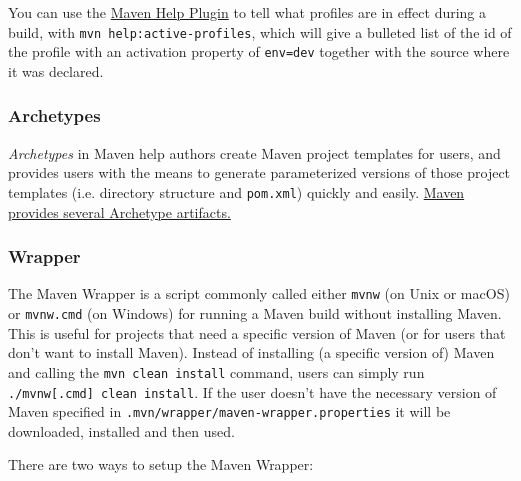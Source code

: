 \documentclass[table, xcdraw]{article}%
\begin{document}
You can use the \href{https://maven.apache.org/plugins/maven-help-plugin/}{Maven Help Plugin} to tell what profiles are in effect during a build, with \texttt{mvn help:active-profiles}, which will give a bulleted list of the id of the profile with an activation property of \texttt{env=dev} together with the source where it was declared.

\subsubsection{Archetypes}

\emph{Archetypes} in Maven help authors create Maven project templates for users, and provides users with the means to generate parameterized versions of those project templates (i.e. directory structure and \texttt{pom.xml}) quickly and easily. \href{https://maven.apache.org/guides/introduction/introduction-to-archetypes.html}{Maven provides several Archetype artifacts.}

\subsubsection{Wrapper}

The Maven Wrapper is a script commonly called either \texttt{mvnw} (on Unix or macOS) or \texttt{mvnw.cmd} (on Windows) for running a Maven build without installing Maven. This is useful for projects that need a specific version of Maven (or for users that don’t want to install Maven). Instead of installing (a specific version of) Maven and calling the \texttt{mvn clean install} command, users can simply run \texttt{./mvnw[.cmd] clean install}. If the user doesn't have the necessary version of Maven specified in \texttt{.mvn/wrapper/maven-wrapper.properties} it will be downloaded, installed and then used.

There are two ways to setup the Maven Wrapper:
\end{document}
